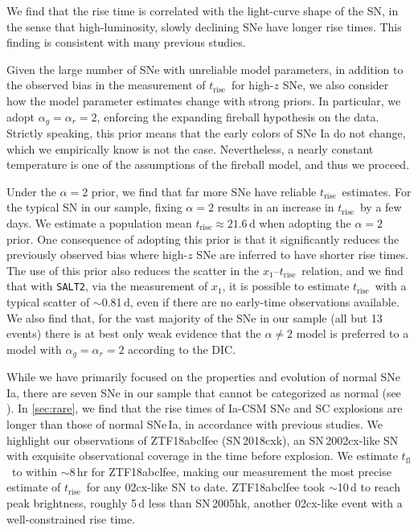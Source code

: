 \documentclass[twocolumn]{./aastex63}
\newcommand{\tfl}{$t_\mathrm{fl}$}
\newcommand{\trise}{$t_\mathrm{rise}$}
\begin{document}
We find that the rise time is correlated with the light-curve shape of the SN,
in the sense that high-luminosity, slowly declining SNe have longer rise
times. This finding is consistent with many previous studies.

Given the large number of SNe with unreliable model parameters, in addition to
the observed bias in the measurement of \trise\ for high-$z$ SNe, we also
consider how the model parameter estimates change with strong priors. In
particular, we adopt $\alpha_g = \alpha_r = 2$, enforcing the expanding
fireball hypothesis on the data. Strictly speaking, this prior means that the
early colors of SNe Ia do not change, which we empirically know is not the
case. Nevertheless, a nearly constant temperature is one of the assumptions of
the fireball model, and thus we proceed.

Under the $\alpha = 2$ prior, we find that far more SNe have reliable \trise\
estimates. For the typical SN in our sample, fixing $\alpha = 2$ results in an
increase in \trise\ by a few days. We estimate a population mean \trise\;$
\approx 21.6$\,d when adopting the $\alpha = 2$ prior. One consequence of
adopting this prior is that it significantly reduces the previously observed
bias where high-$z$ SNe are inferred to have shorter rise times. The use of
this prior also reduces the scatter in the $x_1$--\trise\ relation, and we
find that with \texttt{SALT2}, via the measurement of $x_1$, it is possible to
estimate \trise\ with a typical scatter of $\sim$0.81\,d, even if there are no
early-time observations available. We also find that, for the vast majority of
the SNe in our sample (all but 13 events) there is at best only weak evidence
that the $\alpha \ne 2$ model is preferred to a model with $\alpha_g =
\alpha_r = 2$ according to the DIC.

While we have primarily focused on the properties and evolution of normal SNe
Ia, there are seven SNe in our sample that cannot be categorized as normal (see
\citealt{Yao19}). In \ref{sec:rare}, we find that the rise
times of Ia-CSM SNe and SC explosions are longer than those of normal SNe\,Ia,
in accordance with previous studies. We highlight our observations of
ZTF18abclfee (SN\,2018cxk), an SN\,2002cx-like SN with exquisite observational
coverage in the time before explosion. We estimate \tfl\ to within
$\sim$8\,hr for ZTF18abclfee, making our measurement the most precise estimate
of \trise\ for any 02cx-like SN to date. ZTF18abclfee took $\sim$10\,d to
reach peak brightness, roughly 5\,d less than SN\,2005hk, another 02cx-like
event with a well-constrained rise time.
\end{document}
